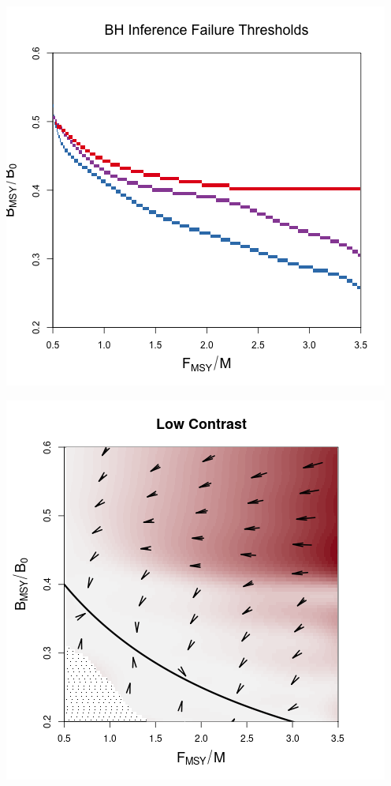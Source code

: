 \documentclass[a0paper,portrait]{baposter}
\begin{document}
\begin{poster}
{\begin{minipage}[h!]{0.61\textwidth}
        	\begin{minipage}[h!]{0.73\textwidth}
        	\includegraphics[width=\textwidth]{../../ddBias/relErrorImagesBHDD0.5.png}
		\end{minipage}
		\begin{minipage}[h!]{0.25\textwidth}
		\includegraphics[width=\textwidth]{../../ddBias/directionalBiasDDSubFlatT45N150A0-1AS0.1K10N56Reds 2.png}\\

\end{minipage}
\end{minipage}}
\end{poster}
\end{document}
